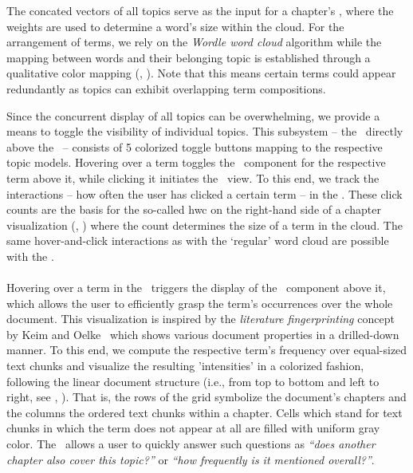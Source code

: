 The concated vectors of all topics serve as the input for a chapter's \wc, where the weights are used to determine a word's size within the cloud.
%
For the arrangement of terms, we rely on the \emph{Wordle word cloud} algorithm \cite{steele2010beautiful} while the mapping between words and their belonging topic is established through a qualitative color mapping (, \wc). 
%
Note that this means certain terms could appear redundantly as topics can exhibit overlapping term compositions.



Since the concurrent display of all topics can be overwhelming, we provide a means to toggle the visibility of individual topics. 
%
This subsystem -- the \tob\ directly above the \wc\ -- consists of 5 colorized toggle buttons mapping to the respective topic models.
%
Hovering over a term toggles the \Tilebar\ component for the respective term above it, while clicking it initiates the \snps\ view. 
%
To this end, we track the interactions -- how often the user has clicked a certain term -- in the \wc.
%
These click counts are the basis for the so-called \acrfull{hwc} on the right-hand side of a chapter visualization (, \hwc) where the count determines the size of a term in the cloud.
%
The same hover-and-click interactions as with the `regular' word cloud are possible with the \hwc.



\paragraph*{\Tilebar}

Hovering over a term in the \wc\ triggers the display of the \tib\ component above it, which allows the user to efficiently grasp the term's occurrences over the whole document. 
%
This visualization is inspired by the \emph{literature fingerprinting} concept by Keim and Oelke~\cite{keim2007literature} which shows various document properties in a drilled-down manner. 
%
To this end, we compute the respective term's frequency over equal-sized text chunks and visualize the resulting 'intensities' in a colorized fashion, following the linear document structure (i.e., from top to bottom and left to right, see , \tib). 
%
That is, the rows of the grid symbolize the document's chapters and the columns the ordered text chunks within a chapter.
%
Cells which stand for text chunks in which the term does not appear at all are filled with uniform gray color.
%
The \tib\ allows a user to quickly answer such questions as \emph{``does another chapter also cover this topic?''} or \emph{``how frequently is it mentioned overall?''}.



